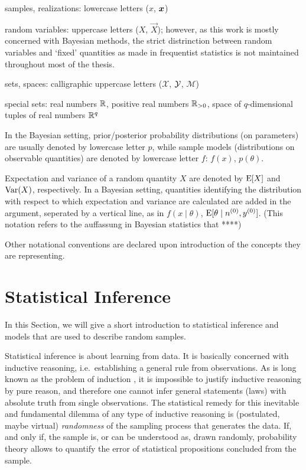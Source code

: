 samples, realizations: lowercase letters ($x$, ${\bm x}$)

random variables: uppercase letters ($X$, $\vec{X}$);
however, as this work is mostly concerned with Bayesian methods,
the strict distrinction between random variables and `fixed' quantities as made in frequentist statistics
is not maintained throughout most of the thesis.

sets, spaces: calligraphic uppercase letters ($\mathcal{X}$, $\mathcal{Y}$, $\mathcal{M}$)

special sets: real numbers $\mathbb{R}$, positive real numbers $\mathbb{R}_{>0}$, space of $q$-dimensional tuples of real numbers $\mathbb{R}^q$

In the Bayesian setting, prior/posterior probability distributions (on parameters) are usually denoted by lowercase letter $p$,
while sample models (distributions on observable quantities) are denoted by lowercase letter $f$:
$f(x)$, $p(\theta)$.

Expectation and variance of a random quantity $X$ are denoted by $\operatorname{E}[X]$ and $\operatorname{Var}(X)$, respectively.
In a Bayesian setting, quantities identifying the distribution
with respect to which expectation and variance are calculated
are added in the argument, seperated by a vertical line, as in $f(x\mid\theta)$, $\operatorname{E}[\theta\mid n^{(0)}, y^{(0)}]$.
(This notation refers to the auffassung in Bayesian statistics that ****)

Other notational conventions are declared upon introduction of the concepts they are representing.


\section{Statistical Inference}
\label{sec:stat-inference}


In this Section, we will give a short introduction to statistical inference
and models that are used to describe random samples.

Statistical inference is about learning from data.
It is basically concerned with inductive reasoning,
i.e.\ establishing a general rule from observations.
As is long known as the problem of induction \parencite{1739:hume},
it is impossible to justify inductive reasoning by pure reason,
and therefore one cannot infer general statements (laws) with absolute truth from single observations.
The statistical remedy for this inevitable and fundamental dilemma of any type of inductive reasoning is
(postulated, maybe virtual) \emph{randomness} of the sampling process that generates the data.
If, and only if, the sample is, or can be understood as, drawn randomly,
probability theory allows to quantify the error of statistical propositions concluded from the sample.

